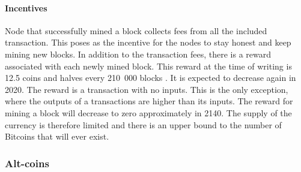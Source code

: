 \paragraph{Incentives}
Node that successfully mined a block collects fees from all the included transaction. This poses as the incentive for the nodes to stay honest and keep mining new blocks. In addition to the transaction fees, there is a reward associated with each newly mined block. This reward at the time of writing is 12.5 coins and halves every 210~000 blocks \cite{Judmayer2017BlocksMechanisms}. It is expected to decrease again in 2020. The reward is a transaction with no inputs. This is the only exception, where the outputs of a transactions are higher than its inputs. The reward for mining a block will decrease to zero approximately in 2140. The supply of the currency is therefore limited and there is an upper bound to the number of Bitcoins that will ever exist\footnotemark.


\subsubsection{Alt-coins}

